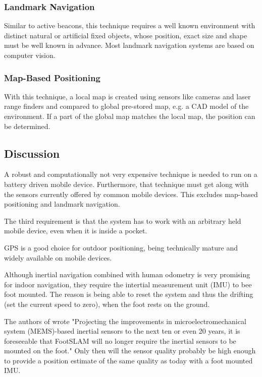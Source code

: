 \subsubsection*{Landmark Navigation}

Similar to active beacons, this technique requires a well known environment with distinct natural or artificial fixed objects, whose position, exact size and shape must be well known in advance. Most landmark navigation systems are based on computer vision.

\subsubsection*{Map-Based Positioning}

With this technique, a local map is created using sensors like cameras and laser range finders and compared to global pre-stored map, e.g. a CAD model of the environment. If a part of the global map matches the local map, the position can be determined. 

\subsection{Discussion}

A robust and computationally not very expensive technique is needed to run on a battery driven mobile device. Furthermore, that technique must get along with the sensors currently offered by common mobile devices. This excludes map-based positioning and landmark navigation.  

The third requirement is that the system has to work with an arbitrary held mobile device, even when it is inside a pocket.

GPS is a good choice for outdoor positioning, being technically mature and widely available on mobile devices. 

Although inertial navigation combined with human odometry is very promising for indoor navigation, they require the intertial measurement unit (IMU) to bee foot mounted. The reason is being able to reset the system and thus the drifting (set the current speed to zero), when the foot rests on the ground. 

The authors of \cite{footslam} wrote "Projecting the improvements in microelectromechanical system (MEMS)-based inertial sensors to the next ten or even 20 years, it is foreseeable that FootSLAM will no longer require the inertial sensors to be mounted on the foot." Only then will the sensor quality probably be high enough to provide a position estimate of the same quality as today with a foot mounted IMU. 


